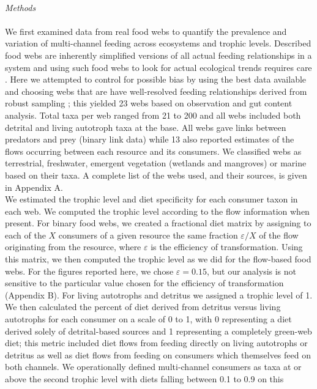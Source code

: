 \documentclass[12pt,a4paper,oneside]{article}
\begin{document}
\\
\emph{Methods}\\
\\
\indent We first examined data from real food webs to quantify the prevalence and
variation of multi-channel feeding across ecosystems and trophic levels.
Described food webs are inherently simplified versions of all actual
feeding relationships in a system and using such food webs to look for
actual ecological trends requires care \citep{Dunne:2004,
  Martinez:1991}. Here we attempted to control for possible bias by using the
best data available and choosing webs that are have well-resolved feeding relationships derived from robust sampling \citep{Martinez:1999}; this yielded
23 webs based on observation and gut content analysis. Total taxa per
web ranged from 21 to 200 and all webs included both detrital and
living autotroph taxa at the base. All webs gave links between
predators and prey (binary link data) while 13 also reported estimates
of the flows occurring between each resource and its
consumers. We classified webs as terrestrial, freshwater, emergent
vegetation (wetlands and mangroves)
or marine based on their taxa. A complete list of the webs used, and
their sources, is given in Appendix A.
\\
\indent We estimated the trophic level
and diet specificity for each consumer taxon in each web. We computed the trophic
level according to the flow
information \citep{Levine:1980} when present. For binary food webs,
we created a fractional diet matrix by assigning
to each of the \(X\) consumers of a given resource the same fraction
\(\varepsilon/X\) of the flow originating from the resource, where
\(\varepsilon\) is the efficiency of transformation. Using this
matrix, we then computed the trophic level as we did for the
flow-based food webs. For the figures reported here, we chose
\(\varepsilon=0.15\), but our analysis is not sensitive to the
particular value chosen for the efficiency of transformation (Appendix
B). For living autotrophs and detritus we
assigned a trophic level of 1. We then calculated the percent of diet
derived from detritus versus living autotrophs for each consumer on a scale
of 0 to 1, with 0 representing a diet derived solely of detrital-based
sources and 1 representing a completely green-web diet; this metric
included diet flows from feeding directly on living
autotrophs or detritus as well as diet flows from feeding on consumers
which themselves feed on both channels. We
operationally defined multi-channel consumers as taxa at or above the
second trophic level with diets falling between 0.1 to 0.9 on this
\end{document}
